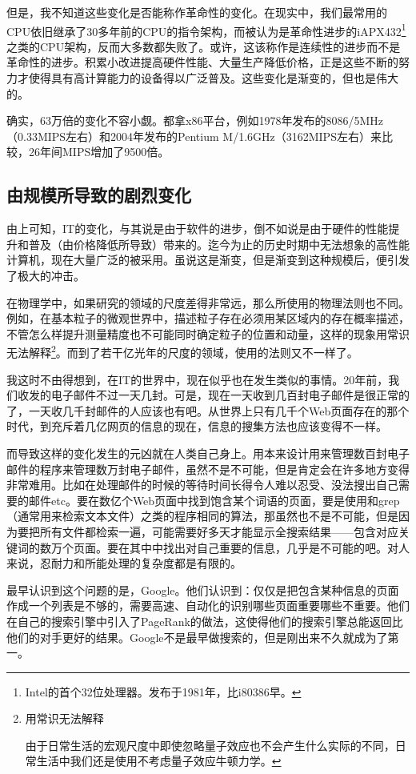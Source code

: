 \documentclass[a4paper,12pt]{article}
\begin{document}
但是，我不知道这些变化是否能称作革命性的变化。在现实中，我们最常用的CPU依旧继承了30多年前的CPU的指令架构，而被认为是革命性进步的iAPX432\footnote{Intel的首个32位处理器。发布于1981年，比i80386早。}之类的CPU架构，反而大多数都失败了。或许，这该称作是连续性的进步而不是革命性的进步。积累小改进提高硬件性能、大量生产降低价格，正是这些不断的努力才使得具有高计算能力的设备得以广泛普及。这些变化是渐变的，但也是伟大的。

确实，63万倍的变化不容小觑。都拿x86平台，例如1978年发布的8086/5MHz（0.33MIPS左右）和2004年发布的Pentium M/1.6GHz（3162MIPS左右）来比较，26年间MIPS增加了9500倍。

\subsection{由规模所导致的剧烈变化}

由上可知，IT的变化，与其说是由于软件的进步，倒不如说是由于硬件的性能提升和普及（由价格降低所导致）带来的。迄今为止的历史时期中无法想象的高性能计算机，现在大量广泛的被采用。虽说这是渐变，但是渐变到这种规模后，便引发了极大的冲击。

在物理学中，如果研究的领域的尺度差得非常远，那么所使用的物理法则也不同。例如，在基本粒子的微观世界中，描述粒子存在必须用某区域内的存在概率描述，不管怎么样提升测量精度也不可能同时确定粒子的位置和动量，这样的现象用常识无法解释\footnote{用常识无法解释

由于日常生活的宏观尺度中即使忽略量子效应也不会产生什么实际的不同，日常生活中我们还是使用不考虑量子效应牛顿力学。}。而到了若干亿光年的尺度的领域，使用的法则又不一样了。

我这时不由得想到，在IT的世界中，现在似乎也在发生类似的事情。20年前，我们收发的电子邮件不过一天几封。可是，现在一天收到几百封电子邮件是很正常的了，一天收几千封邮件的人应该也有吧。从世界上只有几千个Web页面存在的那个时代，到充斥着几亿网页的信息的现在，信息的搜集方法也应该变得不一样。

而导致这样的变化发生的元凶就在人类自己身上。用本来设计用来管理数百封电子邮件的程序来管理数万封电子邮件，虽然不是不可能，但是肯定会在许多地方变得非常难用。比如在处理邮件的时候的等待时间长得令人难以忍受、没法搜出自己需要的邮件etc。要在数亿个Web页面中找到饱含某个词语的页面，要是使用和grep（通常用来检索文本文件）之类的程序相同的算法，那虽然也不是不可能，但是因为要把所有文件都检索一遍，可能需要好多天才能显示全搜索结果——包含对应关键词的数万个页面。要在其中中找出对自己重要的信息，几乎是不可能的吧。对人来说，忍耐力和所能处理的复杂度都是有限的。

最早认识到这个问题的是，Google。他们认识到：仅仅是把包含某种信息的页面作成一个列表是不够的，需要高速、自动化的识别哪些页面重要哪些不重要。他们在自己的搜索引擎中引入了PageRank的做法，这使得他们的搜索引擎总能返回比他们的对手更好的结果。Google不是最早做搜索的，但是刚出来不久就成为了第一。
\end{document}
